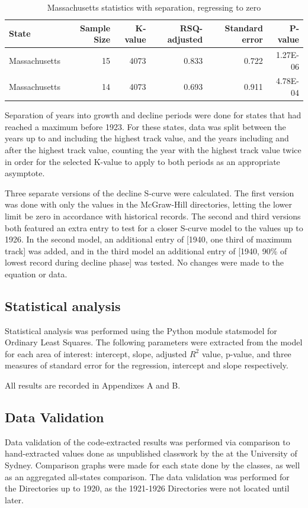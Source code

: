 \begin{table}[h!]
\centering
\begin{tabular}{lrrrrr}
\hline
State & Sample Size & K-value & RSQ-adjusted & Standard error & P-value \\
\hline
Massachusetts & 15 & 4073 & 0.833 & 0.722 & 1.27E-06 \\
\hline 
Massachusetts & 14 & 4073 & 0.693 & 0.911 & 4.78E-04
\end{tabular}
\caption{Massachusetts statistics with separation, regressing to zero}
\end{table}

Separation of years into growth and decline periods were done for states that had reached a maximum before 1923. For these states, data was split between the years up to and including the highest track value, and the years including and after the highest track value, counting the year with the highest track value twice in order for the selected K-value to apply to both periods as an appropriate asymptote. 

Three separate versions of the decline S-curve were calculated. The first version was done with only the values in the McGraw-Hill directories, letting the lower limit be zero in accordance with historical records. The second and third versions both featured an extra entry to test for a closer S-curve model to the values up to 1926. In the second model, an additional entry of [1940, one third of maximum track] was added, and in the third model an additional entry of [1940, 90\% of lowest record during decline phase] was tested. No changes were made to the equation or data.

\subsection{Statistical analysis}
Statistical analysis was performed using the Python module statsmodel \citep{seabold2010statsmodels} for Ordinary Least Squares. The following parameters were extracted from the model for each area of interest: intercept, slope, adjusted $R^2$ value, p-value, and three measures of standard error for the regression, intercept and slope respectively. 

All results are recorded in Appendixes A and B.

\subsection{Data Validation}
Data validation of the code-extracted results was performed via comparison to hand-extracted values done as unpublished classwork by the \citeauthor{civlclass} at the University of Sydney. Comparison graphs were made for each state done by the classes, as well as an aggregated all-states comparison. The data validation was performed for the Directories up to 1920, as the 1921-1926 Directories were not located until later. 

